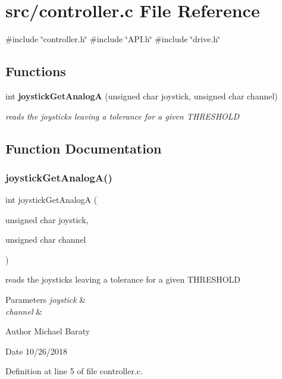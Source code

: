 \section{src/controller.c File Reference}
\label{controller_8c}
{\ttfamily \#include \char`\"{}controller.\+h\char`\"{}}\newline
{\ttfamily \#include \char`\"{}A\+P\+I.\+h\char`\"{}}\newline
{\ttfamily \#include \char`\"{}drive.\+h\char`\"{}}\newline
\subsection*{Functions}
\begin{DoxyCompactItemize}
\item 
int \textbf{ joystick\+Get\+AnalogA} (unsigned char joystick, unsigned char channel)
\begin{DoxyCompactList}\small\item\em reads the joysticks leaving a tolerance for a given T\+H\+R\+E\+S\+H\+O\+LD \end{DoxyCompactList}\end{DoxyCompactItemize}


\subsection{Function Documentation}
\mbox{\label{controller_8c_a03560084f97816fe3f0d05f788f03f06}} 
\subsubsection{joystick\+Get\+Analog\+A()}
{\footnotesize\ttfamily int joystick\+Get\+AnalogA (\begin{DoxyParamCaption}\item[{unsigned char}]{joystick,  }\item[{unsigned char}]{channel }\end{DoxyParamCaption})}



reads the joysticks leaving a tolerance for a given T\+H\+R\+E\+S\+H\+O\+LD 


\begin{DoxyParams}{Parameters}
{\em joystick} & \\
\hline
{\em channel} & \\
\hline
\end{DoxyParams}
\begin{DoxyAuthor}{Author}
Michael Baraty 
\end{DoxyAuthor}
\begin{DoxyDate}{Date}
10/26/2018 
\end{DoxyDate}


Definition at line 5 of file controller.\+c.

